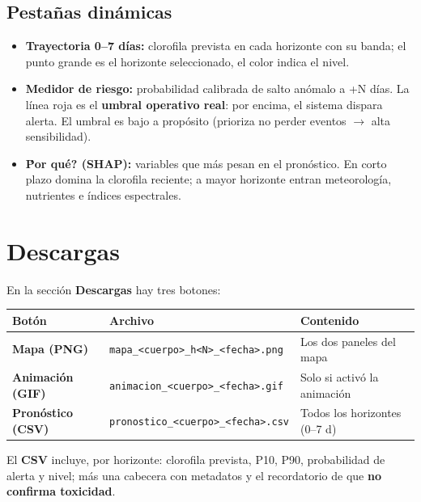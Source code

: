 \documentclass[11pt]{article}
\begin{document}
\subsection{Pesta\~nas din\'amicas}
\begin{itemize}
  \item \textbf{Trayectoria 0--7 d\'ias:} clorofila prevista en cada horizonte con su banda;
  el punto grande es el horizonte seleccionado, el color indica el nivel.
  \item \textbf{Medidor de riesgo:} probabilidad calibrada de salto an\'omalo a +N d\'ias.
  La l\'inea roja es el \textbf{umbral operativo real}: por encima, el sistema dispara
  alerta. El umbral es bajo a prop\'osito (prioriza no perder eventos $\rightarrow$ alta
  sensibilidad).
  \item \textbf{\'Por qu\'e? (SHAP):} variables que m\'as pesan en el pron\'ostico. En corto
  plazo domina la clorofila reciente; a mayor horizonte entran meteorolog\'ia, nutrientes
  e \'indices espectrales.
\end{itemize}

\section{Descargas}
En la secci\'on \textbf{Descargas} hay tres botones:

\begin{tabularx}{\textwidth}{>{\bfseries}l l L}
\toprule
\textbf{Bot\'on} & \textbf{Archivo} & \textbf{Contenido} \\
\midrule
Mapa (PNG)       & \texttt{mapa\_<cuerpo>\_h<N>\_<fecha>.png} & Los dos paneles del mapa \\
Animaci\'on (GIF) & \texttt{animacion\_<cuerpo>\_<fecha>.gif}   & Solo si activ\'o la animaci\'on \\
Pron\'ostico (CSV)& \texttt{pronostico\_<cuerpo>\_<fecha>.csv}  & Todos los horizontes (0--7 d) \\
\bottomrule
\end{tabularx}

El \textbf{CSV} incluye, por horizonte: clorofila prevista, P10, P90, probabilidad de
alerta y nivel; m\'as una cabecera con metadatos y el recordatorio de que \textbf{no
confirma toxicidad}.

\end{document}
